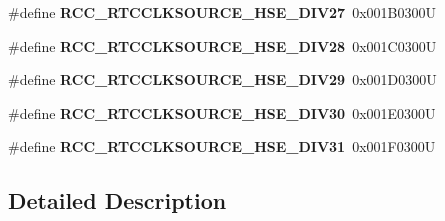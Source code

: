 \begin{DoxyCompactItemize}
\#define {\bfseries R\+C\+C\+\_\+\+R\+T\+C\+C\+L\+K\+S\+O\+U\+R\+C\+E\+\_\+\+H\+S\+E\+\_\+\+D\+I\+V27}~0x001\+B0300U
\item 
\mbox{\label{group___r_c_c___r_t_c___clock___source_ga28e7a9291c903b820991c3a3e80c9ae1}} 
\#define {\bfseries R\+C\+C\+\_\+\+R\+T\+C\+C\+L\+K\+S\+O\+U\+R\+C\+E\+\_\+\+H\+S\+E\+\_\+\+D\+I\+V28}~0x001\+C0300U
\item 
\mbox{\label{group___r_c_c___r_t_c___clock___source_gac22536498ea83e12ecd83f04d5e98858}} 
\#define {\bfseries R\+C\+C\+\_\+\+R\+T\+C\+C\+L\+K\+S\+O\+U\+R\+C\+E\+\_\+\+H\+S\+E\+\_\+\+D\+I\+V29}~0x001\+D0300U
\item 
\mbox{\label{group___r_c_c___r_t_c___clock___source_ga5849760bab0f4057bd254cd022dc1a7a}} 
\#define {\bfseries R\+C\+C\+\_\+\+R\+T\+C\+C\+L\+K\+S\+O\+U\+R\+C\+E\+\_\+\+H\+S\+E\+\_\+\+D\+I\+V30}~0x001\+E0300U
\item 
\mbox{\label{group___r_c_c___r_t_c___clock___source_ga074ac97804136221e39f50eb4cf13e3a}} 
\#define {\bfseries R\+C\+C\+\_\+\+R\+T\+C\+C\+L\+K\+S\+O\+U\+R\+C\+E\+\_\+\+H\+S\+E\+\_\+\+D\+I\+V31}~0x001\+F0300U
\end{DoxyCompactItemize}


\subsection{Detailed Description}
